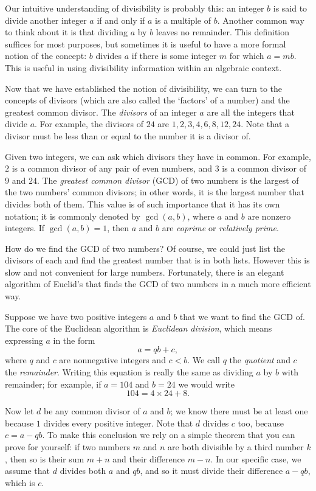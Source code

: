\documentclass[a4paper,10pt]{article}
\begin{document}
Our intuitive understanding of divisibility is probably this: an
integer $b$ is said to divide another integer $a$ if and only if
$a$ is a multiple of $b$. 
Another common way to think about it is that dividing $a$ by $b$
leaves no remainder. This definition suffices for most purposes,
but sometimes it is useful to have a more formal notion of the concept:
$b$ divides $a$ if there is some integer $m$ for which $a=mb$. This
is useful in using divisibility information within an algebraic context.

Now that we have established the notion of
divisibility, we can turn to the concepts of divisors (which are also
called the `factors' of a number) and the greatest common divisor.
The \emph{divisors} of an integer $a$ are all the integers that divide $a$.
For example, the divisors of $24$ are $1,2,3,4,6,8,12,24$. Note that a divisor must
be less than or equal to the number it is a divisor of.

Given two integers, we can ask which divisors they have in common.
For example, $2$ is a common divisor of any pair of even numbers, and $3$ is
a common divisor of $9$ and $24$. The \emph{greatest common divisor} (GCD) of
two numbers is the largest of the two numbers' common divisors; in other words,
it is the largest number that divides both of them. This value is of such
importance that it has its own notation; it is commonly denoted by $\gcd(a,b)$, where
$a$ and $b$ are nonzero integers. If $\gcd(a,b)=1$, then $a$ and $b$ are \emph{coprime}
or \emph{relatively prime}.

How do we find the GCD of two numbers? Of course, we could just list the divisors
of each and find the greatest number that is in both lists. However this is slow
and not convenient for large numbers. Fortunately, there is an elegant algorithm of
Euclid's that finds the GCD of two numbers in a much more efficient way.

Suppose we have two positive integers $a$ and $b$ that we want to find the GCD of.
The core of the Euclidean algorithm is \emph{Euclidean division}, which means expressing $a$
in the form \[a=qb+c,\] where $q$ and $c$ are nonnegative integers and $c<b$. We call $q$
the \emph{quotient} and $c$ the \emph{remainder}. Writing
this equation is really the same as dividing $a$ by $b$ with remainder; for example, if $a=104$ and $b=24$
we would write \[104=4\times24+8.\]

Now let $d$ be any common divisor of $a$ and $b$; we know there must be at least one
because $1$ divides every positive integer. Note that $d$ divides $c$ too, because $c=a-qb$.
To make this conclusion we rely on a simple theorem that you can prove for yourself:
if two numbers $m$ and $n$ are both divisible by a third number $k$, then so is their
sum $m+n$ and their difference $m-n$. In our specific case, we assume that $d$ divides both
$a$ and $qb$, and so it must divide their difference $a-qb$, which is $c$.
\end{document}
